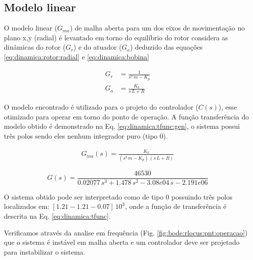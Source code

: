 \subsection{Modelo linear}
O modelo linear ($G_{ma}$) de malha aberta para um dos eixos de movimentação no plano x,y (radial) é levantado em torno do equilíbrio do rotor considera as dinâmicas do rotor ($G_r$) e do atuador ($G_a$) deduzido das equações  \eqref{eq:dinamica:rotor:radial} e \eqref{eq:dinamica:bobina}

\begin{align}
	G_r &= \frac{1}{s^2 \, m - K_p} \\
	G_a &= \frac{K_b}{s\, L + R}
\end{align}

O modelo encontrado é utilizado para o projeto do controlador ($C(s)$), esse otimizado para operar em torno do ponto de operação. A função transferência do modelo obtido é demonstrado na Eq. \eqref{eq:dinamica:tfunc:gen}, o sistema possui três polos sendo eles nenhum integrador puro (tipo 0). 

\begin{align}
	G_{ma}(s) = \frac{K_b}{(s^2 \, m - K_p) \, (s\, L + R)}
	\label{eq:dinamica:tfunc:gen}
\end{align}
 
 
 \begin{equation}
 G(s) = \frac{46530}{ 0.02077 \, s^3 + 1.478 \, s^2 - 3.08e04 \,s - 2.191e06}
 \label{eq:dinamica:tfunc}
 \end{equation}



O sistema obtido pode ser interpretado como de tipo 0 possuindo três polos localizados em:  $[1.21 -1.21 -0.07] \, 10^ 3$, onde a função de transferência é descrita na Eq. \eqref{eq:dinamica:tfunc}. 

Verificamos através da analise em frequência (Fig. \ref{fig:bode:rlocus:pnt:operacao}) que o sistema é instável em malha aberta e um controlador deve ser projetado para instabilizar o sistema. 


